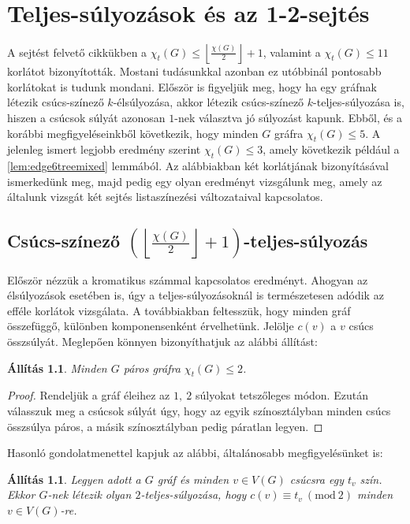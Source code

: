 \documentclass[12pt, a4paper]{report}
\newtheorem{áll}[tét]{Állítás}
\theoremstyle{remark}
\theoremstyle{definition}
\begin{document}
\chapter{Teljes-súlyozások és az 1-2-sejtés}
A sejtést felvető cikkükben \citeauthor{Przybylo2010} a $\chi_t(G) \leq \left\lfloor \frac{\chi(G)}{2} \right\rfloor + 1$, valamint a $\chi_t(G) \leq 11$ korlátot bizonyították. Mostani tudásunkkal azonban ez utóbbinál pontosabb korlátokat is tudunk mondani. Először is figyeljük meg, hogy ha egy gráfnak létezik csúcs-színező $k$-élsúlyozása, akkor létezik csúcs-színező $k$-teljes-súlyozása is, hiszen a csúcsok súlyát azonosan $1$-nek választva jó súlyozást kapunk. Ebből, és a korábbi megfigyeléseinkből következik, hogy minden $G$ gráfra $\chi_t(G) \leq 5$. A jelenleg ismert legjobb eredmény szerint $\chi_t(G) \leq 3$, amely következik például a \ref{lem:edge6treemixed} lemmából. Az alábbiakban \citeauthor{Przybylo2010} két korlátjának bizonyításával ismerkedünk meg, majd pedig egy olyan eredményt vizsgálunk meg, amely az általunk vizsgát két sejtés listaszínezési változataival kapcsolatos.

\section{Csúcs-színező $\left( \left\lfloor \frac{χ(G)}{2} \right\rfloor + 1 \right)$-teljes-súlyozás}
Először nézzük a kromatikus számmal kapcsolatos eredményt. Ahogyan az élsúlyozások esetében is, úgy a teljes-súlyozásoknál is természetesen adódik az efféle korlátok vizsgálata. A továbbiakban feltesszük, hogy minden gráf összefüggő, különben komponensenként érvelhetünk. Jelölje $c(v)$ a $v$ csúcs összsúlyát. Meglepően könnyen bizonyíthatjuk az alábbi állítást:

\begin{áll}
Minden $G$ páros gráfra $\chi_t(G) \leq 2$.
\end{áll}

\begin{proof}
Rendeljük a gráf éleihez az $1,\ 2$ súlyokat tetszőleges módon. Ezután válasszuk meg a csúcsok súlyát úgy, hogy az egyik színosztályban minden csúcs összsúlya páros, a másik színosztályban pedig páratlan legyen.
\end{proof}

Hasonló gondolatmenettel kapjuk az alábbi, általánosabb megfigyelésünket is:

\begin{áll}
Legyen adott a $G$ gráf és minden $v \in V(G)$ csúcsra egy $t_v$ szín. Ekkor $G$-nek létezik olyan $2$-teljes-súlyozása, hogy $c(v) ≡ t_v\ (\mathrm{mod}\ 2)$ minden $v \in V(G)$-re. 
\end{áll}
\end{document}
